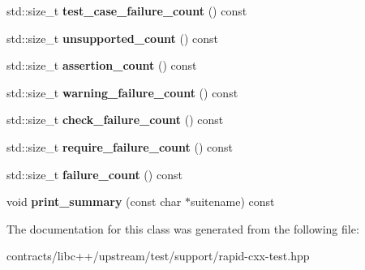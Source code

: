\begin{DoxyCompactItemize}
std\+::size\+\_\+t {\bfseries test\+\_\+case\+\_\+failure\+\_\+count} () const
\item 
\mbox{\label{classrapid__cxx__test_1_1test__reporter_a0b05b788587eb9f962e16792100e0d6e}} 
std\+::size\+\_\+t {\bfseries unsupported\+\_\+count} () const
\item 
\mbox{\label{classrapid__cxx__test_1_1test__reporter_a100deeb49fbda097cdbbf9ff8da69e95}} 
std\+::size\+\_\+t {\bfseries assertion\+\_\+count} () const
\item 
\mbox{\label{classrapid__cxx__test_1_1test__reporter_a996a01190f8a9d7846a202d1956f81be}} 
std\+::size\+\_\+t {\bfseries warning\+\_\+failure\+\_\+count} () const
\item 
\mbox{\label{classrapid__cxx__test_1_1test__reporter_aafce6ba0cd4b8f0787f899956131cf2c}} 
std\+::size\+\_\+t {\bfseries check\+\_\+failure\+\_\+count} () const
\item 
\mbox{\label{classrapid__cxx__test_1_1test__reporter_a130abf3d9d521d7b60599fae32aa52e3}} 
std\+::size\+\_\+t {\bfseries require\+\_\+failure\+\_\+count} () const
\item 
\mbox{\label{classrapid__cxx__test_1_1test__reporter_afbd9b7a69c7fac1fc2d7b7af6bc75fa7}} 
std\+::size\+\_\+t {\bfseries failure\+\_\+count} () const
\item 
\mbox{\label{classrapid__cxx__test_1_1test__reporter_aa884f86a01cc590195bf24a69306b39f}} 
void {\bfseries print\+\_\+summary} (const char $\ast$suitename) const
\end{DoxyCompactItemize}


The documentation for this class was generated from the following file\+:\begin{DoxyCompactItemize}
\item 
contracts/libc++/upstream/test/support/rapid-\/cxx-\/test.\+hpp\end{DoxyCompactItemize}
